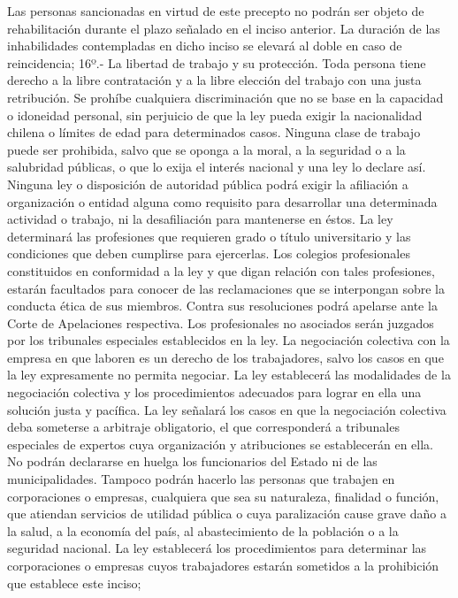     Las personas sancionadas en virtud de este precepto no podrán ser objeto de rehabilitación durante el plazo señalado en el inciso anterior. La duración de las inhabilidades contempladas en dicho inciso se elevará al doble en caso de reincidencia;
    16º.- La libertad de trabajo y su protección.
    Toda persona tiene derecho a la libre contratación y a la libre elección del trabajo con una justa retribución.
    Se prohíbe cualquiera discriminación que no se base en la capacidad o idoneidad personal, sin perjuicio de que la ley pueda exigir la nacionalidad chilena o límites de edad para determinados casos.
    Ninguna clase de trabajo puede ser prohibida, salvo que se oponga a la moral, a la seguridad o a la salubridad públicas, o que lo exija el interés nacional y una ley lo declare así. Ninguna ley o disposición de autoridad pública podrá exigir la afiliación a organización o entidad alguna como requisito para desarrollar una determinada actividad o trabajo, ni la desafiliación para mantenerse en éstos. La ley determinará las profesiones que requieren grado o título universitario y las condiciones que deben cumplirse para ejercerlas. Los colegios profesionales constituidos en conformidad a la ley y que digan relación con tales profesiones, estarán facultados para conocer de las reclamaciones que se interpongan sobre la conducta ética de sus miembros. Contra sus resoluciones podrá apelarse ante la Corte de Apelaciones respectiva. Los profesionales no asociados serán juzgados por los tribunales especiales establecidos en la ley.
    La negociación colectiva con la empresa en que laboren es un derecho de los trabajadores, salvo los casos en que la ley expresamente no permita negociar. La ley establecerá las modalidades de la negociación colectiva y los procedimientos adecuados para lograr en ella una solución justa y pacífica. La ley señalará los casos en que la negociación colectiva deba someterse a arbitraje obligatorio, el que corresponderá a tribunales especiales de expertos cuya organización y atribuciones se establecerán en ella.
    No podrán declararse en huelga los funcionarios del Estado ni de las municipalidades. Tampoco podrán hacerlo las personas que trabajen en corporaciones o empresas, cualquiera que sea su naturaleza, finalidad o función, que atiendan servicios de utilidad pública o cuya paralización cause grave daño a la salud, a la economía del país, al abastecimiento de la población o a la seguridad nacional. La ley establecerá los procedimientos para determinar las corporaciones o empresas cuyos trabajadores estarán sometidos a la prohibición que establece este inciso;
